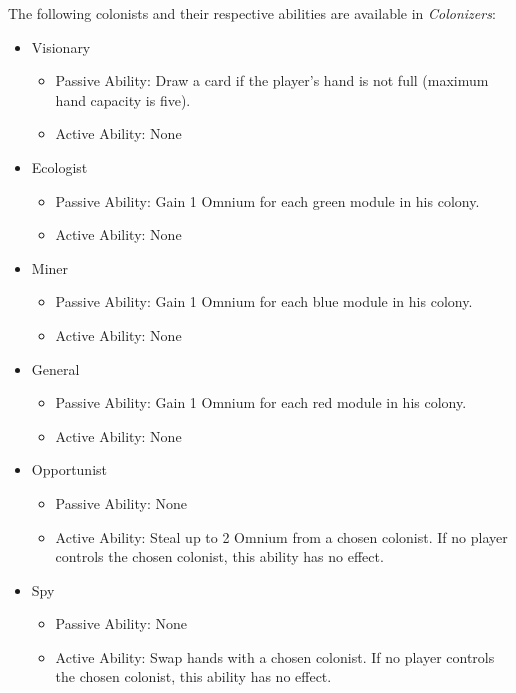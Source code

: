 The following colonists and their respective abilities are available in \emph{Colonizers}:
\begin{itemize}
    \item Visionary
        \begin{itemize}
            \item Passive Ability: Draw a card if the player's hand is not full
                (maximum hand capacity is five).
            \item Active Ability: None
        \end{itemize}
    \item Ecologist
        \begin{itemize}
            \item Passive Ability: Gain 1 Omnium for each green module in his colony.
            \item Active Ability: None
        \end{itemize}
    \item Miner
        \begin{itemize}
            \item Passive Ability: Gain 1 Omnium for each blue module in his colony.
            \item Active Ability: None
        \end{itemize}
    \item General
        \begin{itemize}
            \item Passive Ability: Gain 1 Omnium for each red module in his colony.
            \item Active Ability: None
        \end{itemize}
    \item Opportunist
        \begin{itemize}
            \item Passive Ability: None
            \item Active Ability: Steal up to 2 Omnium from a chosen colonist.
                If no player controls the chosen colonist, this ability has no effect.
        \end{itemize}
    \item Spy
        \begin{itemize}
            \item Passive Ability: None
            \item Active Ability: Swap hands with a chosen colonist.
                If no player controls the chosen colonist, this ability has no effect.
        \end{itemize}
\end{itemize}

